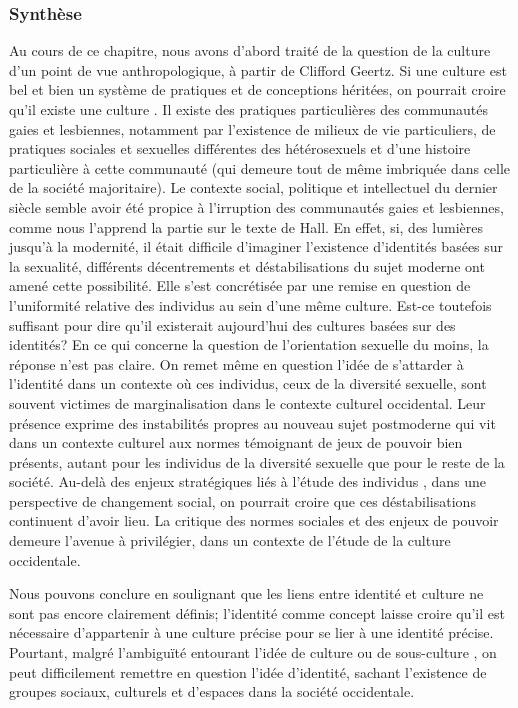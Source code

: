 \subsubsection{Synthèse}
\label{sec:synth_se} 
Au cours de ce chapitre, nous avons d'abord traité de la question de la culture d'un point de vue anthropologique, à partir de Clifford Geertz.
Si une culture est bel et bien un système de pratiques et de conceptions héritées, on pourrait croire qu'il existe une culture \lgbt{}. 
Il existe des pratiques particulières des communautés gaies et lesbiennes, notamment par l'existence de milieux de vie particuliers, de pratiques sociales et sexuelles différentes des hétérosexuels et d'une histoire particulière à cette communauté (qui demeure tout de même imbriquée dans celle de la société majoritaire).
Le contexte social, politique et intellectuel du dernier siècle semble avoir été propice à l'irruption des communautés gaies et lesbiennes, comme nous l'apprend la partie sur le texte de Hall. 
En effet, si, des lumières jusqu'à la modernité, il était difficile d'imaginer l'existence d'identités basées sur la sexualité, différents décentrements et déstabilisations du sujet moderne ont amené cette possibilité.
Elle s'est concrétisée par une remise en question de l'uniformité relative des individus au sein d'une même culture. 
Est-ce toutefois suffisant pour dire qu'il existerait aujourd'hui des cultures basées sur des identités? 
En ce qui concerne la question de l'orientation sexuelle du moins, la réponse n'est pas claire. 
On remet même en question l'idée de s'attarder à l'identité dans un contexte où ces individus, ceux de la diversité sexuelle, sont souvent victimes de marginalisation dans le contexte culturel occidental. 
Leur présence exprime des instabilités propres au nouveau sujet postmoderne qui vit dans un contexte culturel aux normes témoignant de jeux de pouvoir bien présents, autant pour les individus de la diversité sexuelle que pour le reste de la société. 
Au-delà des enjeux stratégiques liés à l'étude des individus \lgbt{}, dans une perspective de changement social, on pourrait croire que ces déstabilisations continuent d'avoir lieu. 
La critique des normes sociales et des enjeux de pouvoir demeure l'avenue à privilégier, dans un contexte de l'étude de la culture occidentale.

Nous pouvons conclure en soulignant que les liens entre identité et culture ne sont pas encore clairement définis; l'identité comme concept laisse croire qu'il est nécessaire d'appartenir à une culture précise pour se lier à une identité précise. 
Pourtant, malgré l'ambiguïté entourant l'idée de culture ou de sous-culture \lgbt{}, on peut difficilement remettre en question l'idée d'identité, sachant l'existence de groupes sociaux, culturels et d'espaces \lgbt{} dans la société occidentale.

